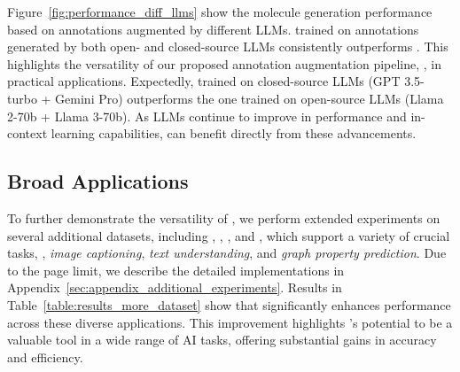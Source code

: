 

Figure~\ref{fig:performance_diff_llms} show the molecule generation performance based on annotations augmented by different LLMs. 
% 
\newmodel trained on \newdataset annotations generated by both open- and closed-source LLMs consistently outperforms \oldmodel. 
This highlights the versatility of our proposed annotation augmentation pipeline, \pipeline, in practical applications. 
% 
Expectedly, \newmodel trained on closed-source LLMs (GPT 3.5-turbo + Gemini Pro) outperforms the one trained on open-source LLMs (Llama 2-70b + Llama 3-70b). 
As LLMs continue to improve in performance and in-context learning capabilities, \newmodel can benefit directly from these advancements. 

\subsection{Broad Applications}
\label{subsec:broad_application}



To further demonstrate the versatility of \pipeline, we perform extended experiments on several additional datasets, including \bace, \hiv, \esol, and \image, which support a variety of crucial tasks, \eg, \emph{image captioning}, \emph{text understanding}, and \emph{graph property prediction}.
Due to the page limit, we describe the detailed implementations in Appendix~\ref{sec:appendix_additional_experiments}. 
Results in Table~\ref{table:results_more_dataset} show that \pipeline significantly enhances performance across these diverse applications. 
This improvement highlights \pipeline’s potential to be a valuable tool in a wide range of AI tasks, offering substantial gains in accuracy and efficiency.
